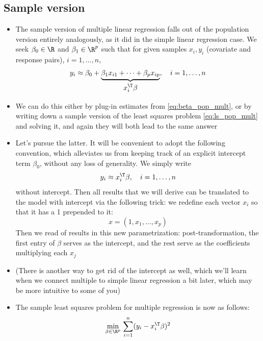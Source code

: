 \documentclass{article}
\begin{document}
\subsection{Sample version}

\begin{itemize}
\item The sample version of multiple linear regression falls out of the 
  population version entirely analogously, as it did in the simple linear
  regression case. We seek $\beta_0 \in \R$ and $\beta_1 \in \R^p$ 
  such that for given samples $x_i,y_i$ (covariate and response pairs), $i =
  1,\dots,n$,  
  \[
  y_i \approx \beta_0 + \underbrace{\beta_1 x_{i1} + \cdots + \beta_p 
    x_{ip}}_{\textstyle \begin{array}{c} x_i^\T \beta \end{array}}, \quad 
  i = 1,\dots,n 
  \]

\item We can do this either by plug-in estimates from \eqref{eq:beta_pop_mult},
  or by writing down a sample version of the least squares problem
  \eqref{eq:ls_pop_mult} and solving it, and again they will both lead to the 
  same answer

\item Let's pursue the latter. It will be convenient to adopt the following
  convention, which alleviates us from keeping track of an explicit intercept 
  term $\beta_0$, without any loss of generality. We simply write  
  \[
  y_i \approx x_i^\T \beta, \quad i = 1,\dots,n
  \]
  without intercept. Then all results that we will derive can be translated to
  the model with intercept via the following trick: we redefine each vector
  $x_i$ so that it has a 1 prepended to it:   
  \begin{equation}
  \label{eq:x_intercept}
  x = (1, x_1, \dots, x_p)
  \end{equation}
  Then we read of results in this new parametrization: post-transformation, the
  first entry of $\beta$ serves as the intercept, and the rest serve as the
  coefficients multiplying each $x_j$   

\item (There is another way to get rid of the intercept as well, which we'll
  learn when we connect multiple to simple linear regression a bit later, which
  may be more intuitive to some of you) 

\item The sample least squares problem for multiple regression is now as
  follows:  
  \begin{equation}
  \label{eq:ls_mult1}
  \min_{\beta \in \R^p} \, \sum_{i=1}^n (y_i - x_i^\T \beta)^2 
  \end{equation}


\end{itemize}
\end{document}
